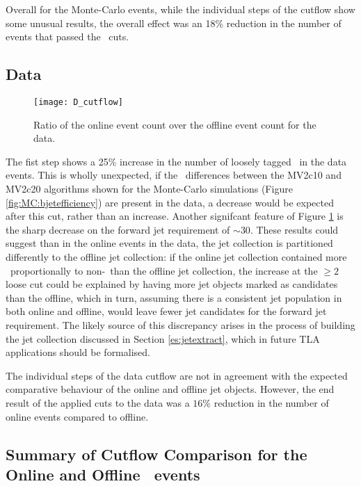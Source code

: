     Overall for the Monte-Carlo events, while the individual steps of the cutflow show some unusual results, the overall effect was an 18\% reduction in the number of events that passed the \VBFHBB\, cuts.

    \subsection{Data}
        \begin{figure}[h]
            \centering
            \texttt{[image: D\_cutflow]}
            \caption[\VBFHBB\ Cutflow ratio for data]{Ratio of the online event count over the offline event count for the data.}
            \label{f:cutflowD}
        \end{figure}

    The fist step shows a 25\% increase in the number of loosely tagged \bjets\ in the data events. This is wholly unexpected, if the \btag\ differences between the MV2c10 and MV2c20 algorithms shown for the Monte-Carlo simulations (Figure \ref{fig:MC:bjetefficiency}) are present in the data, a decrease would be expected after this cut, rather than an increase. Another signifcant feature of Figure \ref{f:cutflowD} is the sharp decrease on the forward jet requirement of $\sim30$. These results could suggest than in the online events in the data, the jet collection is partitioned differently to the offline jet collection: if the online jet collection contained more \bjets\ proportionally to non-\bjets\ than the offline jet collection, the increase at the $\geq2$ loose \bjet cut could be explained by having more jet objects marked as candidates than the offline, which in turn, assuming there is a consistent jet population in both online and offline, would leave fewer jet candidates for the forward jet requirement. The likely source of this discrepancy arises in the process of building the jet collection discussed in Section \ref{es:jetextract}, which in future TLA applications should be formalised.

    The individual steps of the data cutflow are not in agreement with the expected comparative behaviour of the online and offline jet objects. However, the end result of the applied cuts to the data was a $16\%$ reduction in the number of online events compared to offline.

    \subsection{Summary of Cutflow Comparison for the Online and Offline \VBFHBB\ events}

